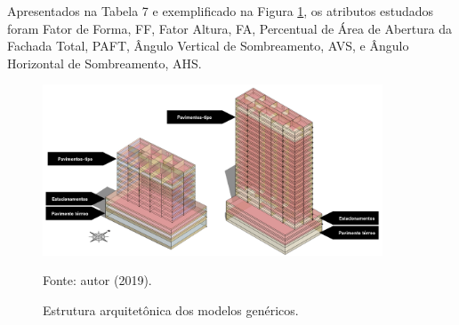 \noindent Apresentados na Tabela 7 e exemplificado na Figura \ref{fig:figura9}, os atributos estudados foram Fator de Forma, FF, Fator Altura, FA, Percentual de Área de Abertura da Fachada Total, PAFT, Ângulo Vertical de Sombreamento, AVS, e Ângulo Horizontal de Sombreamento, AHS.\vspace*{0.3cm}
\begin{figure}[H]
    \centering
    \caption{\small Estrutura arquitetônica dos modelos genéricos.}
    \includegraphics[width=0.9\textwidth]{figures/fig11_8-19-2pav.png}
    \begin{flushleft}
        \par \small Fonte: autor (2019).
    \end{flushleft}
    \label{fig:figura9}
\end{figure}

